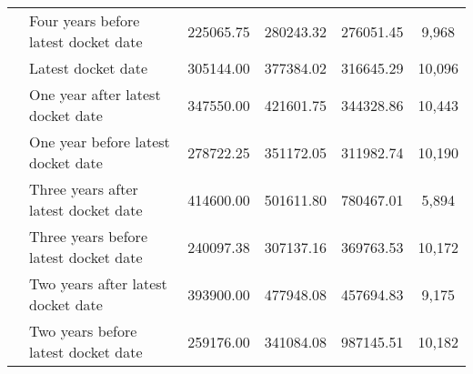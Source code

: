 \begin{tabular}{llcccc}
 & Four years before latest docket date & 225065.75 & 280243.32 & 276051.45 & 9,968 \\
 & Latest docket date & 305144.00 & 377384.02 & 316645.29 & 10,096 \\
 & One year after latest docket date & 347550.00 & 421601.75 & 344328.86 & 10,443 \\
 & One year before latest docket date & 278722.25 & 351172.05 & 311982.74 & 10,190 \\
 & Three years after latest docket date & 414600.00 & 501611.80 & 780467.01 & 5,894 \\
 & Three years before latest docket date & 240097.38 & 307137.16 & 369763.53 & 10,172 \\
 & Two years after latest docket date & 393900.00 & 477948.08 & 457694.83 & 9,175 \\
 & Two years before latest docket date & 259176.00 & 341084.08 & 987145.51 & 10,182 \\
\cline{1-6}
\bottomrule
\end{tabular}
